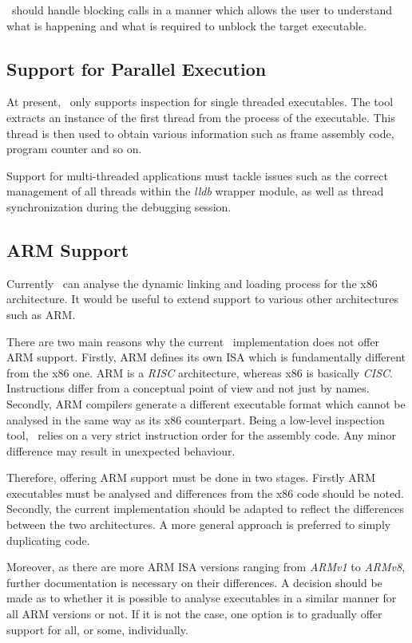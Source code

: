 \project\ should handle blocking calls in a manner which allows the user to understand what is happening and what is required to unblock the target executable.

\subsection{Support for Parallel Execution}
\label{sub-sec:parallel-further}

At present, \project\ only supports inspection for single threaded executables. The tool extracts an instance of the first thread from the process of the executable. This thread is then used to obtain various information such as frame assembly code, program counter and so on. 

Support for multi-threaded applications must tackle issues such as the correct management of all threads within the \textit{lldb} wrapper module, as well as thread synchronization during the debugging session.

\subsection{ARM Support}
\label{sub-sec:arm-support-further}

Currently \project\ can analyse the dynamic linking and loading process for the x86 architecture. It would be useful to extend support to various other architectures such as ARM.

There are two main reasons why the current \project\ implementation does not offer ARM support. Firstly, ARM defines its own ISA \cite{arm-manual} which is fundamentally different from the x86 one. ARM is a \textit{RISC} architecture, whereas x86 is basically \textit{CISC}. Instructions differ from a conceptual point of view and not just by names. Secondly, ARM compilers generate a different executable format which cannot be analysed in the same way as its x86 counterpart. Being a low-level inspection tool, \project\ relies on a very strict instruction order for the assembly code. Any minor difference may result in unexpected behaviour.

Therefore, offering ARM support must be done in two stages. Firstly ARM executables must be analysed and differences from the x86 code should be noted. Secondly, the current implementation should be adapted to reflect the differences between the two architectures. A more general approach is preferred to simply duplicating code.

Moreover, as there are more ARM ISA versions ranging from \textit{ARMv1} to \textit{ARMv8}, further documentation is necessary on their differences. A decision should be made as to whether it is possible to analyse executables in a similar manner for all ARM versions or not. If it is not the case, one option is to gradually offer support for all, or some, individually.


